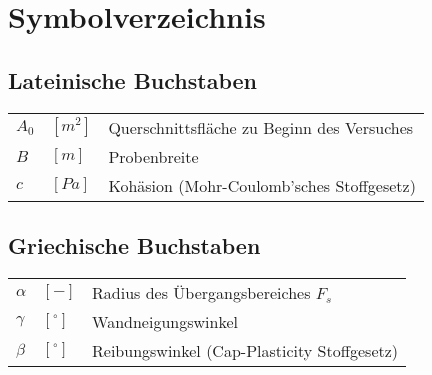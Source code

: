 \chapter{Symbolverzeichnis}

\section*{Lateinische Buchstaben}

	\begin{longtable}[l]{p{1cm}p{1cm}l}
		$A_0$ & $[m^2]$ & Querschnittsfläche zu Beginn des Versuches \\
		$B$ & $[m]$ & Probenbreite\\
		$c$ & $[Pa]$ & Kohäsion (Mohr-Coulomb'sches Stoffgesetz) \\
	\end{longtable}


\section*{Griechische Buchstaben}

	\begin{longtable}[l]{p{1cm}p{1cm}l}
		$\alpha$ & $[-]$ & Radius des Übergangsbereiches $F_s$ \\
		$\gamma$ & $[^\circ]$ & Wandneigungswinkel \\
		$\beta$ & $[^\circ]$ & Reibungswinkel (Cap-Plasticity Stoffgesetz) \\	
	\end{longtable}
